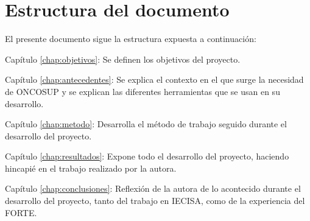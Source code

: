 \section{Estructura del documento}

El presente documento sigue la estructura expuesta a continuación:

\begin{definitionlist}
\item[Capítulo \ref{chap:objetivos}: \nameref{chap:objetivos}] Se definen los objetivos del proyecto.
\item[Capítulo \ref{chap:antecedentes}: \nameref{chap:antecedentes}] Se explica el contexto en el que surge la necesidad de ONCOSUP y se explican las diferentes herramientas que se usan en su desarrollo.
\item[Capítulo \ref{chap:metodo}: \nameref{chap:metodo}] Desarrolla el método de trabajo seguido durante el desarrollo del proyecto.
\item[Capítulo \ref{chap:resultados}: \nameref{chap:resultados}] Expone todo el desarrollo del proyecto, haciendo hincapié en el trabajo realizado por la autora.
\item[Capítulo \ref{chap:conclusiones}: \nameref{chap:conclusiones}] Reflexión de la autora de lo acontecido durante el desarrollo del proyecto, tanto del trabajo en IECISA, como de la experiencia del FORTE.
\end{definitionlist}


